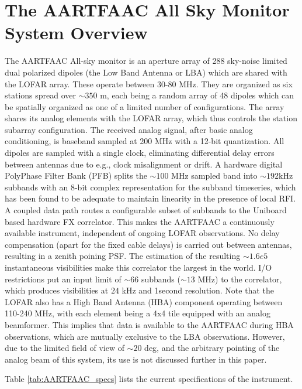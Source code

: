 \documentclass{aa}
\begin{document}
\section{\label{sec:The-AARTFAAC-All}The AARTFAAC All Sky Monitor System
Overview}
The AARTFAAC All-sky monitor is an aperture array of 288 sky-noise
limited dual polarized dipoles (the Low Band Antenna or LBA) which
are shared with the LOFAR array. These operate between 30-80 MHz.
They are organized as six stations spread over $\sim$$350$ m, each
being a random array of 48 dipoles which can be spatially organized
as one of a limited number of configurations. The array shares its
analog elements with the LOFAR array, which thus controls the station
subarray configuration. The received analog signal, after basic analog
conditioning, is baseband sampled at 200 MHz with a 12-bit quantization.
All dipoles are sampled with a single clock, eliminating differential
delay errors between antennas due to e.g., clock misalignment or drift.
A hardware digital PolyPhase Filter Bank (PFB) splits the $\sim$$100$
MHz sampled band into $\sim$$192$kHz subbands with an 8-bit complex
representation for the subband timeseries, which has been found to
be adequate to maintain linearity in the presence of local RFI. A
coupled data path routes a configurable subset of subbands to the
Uniboard based hardware FX correlator. This makes the AARTFAAC a continuously
available instrument, independent of ongoing LOFAR observations. No
delay compensation (apart for the fixed cable delays) is carried out
between antennas, resulting in a zenith poining PSF. The estimation
of the resulting $\sim$$1.6e5$ instantaneous visibilities make this
correlator the largest in the world. I/O restrictions put an input
limit of $\sim$$66$ subbands ($\sim$$13$ MHz) to the correlator,
which produces visibilities at $24$ kHz and 1second resolution. Note
that the LOFAR also has a High Band Antenna (HBA) component operating
between 110-240 MHz, with each element being a 4x4 tile equipped with
an analog beamformer. This implies that data is available to the AARTFAAC
during HBA observations, which are mutually exclusive to the LBA observations.
However, due to the limited field of view of $\sim$$20$ deg, and
the arbitrary pointing of the analog beam of this system, its use
is not discussed further in this paper. 

Table \ref{tab:AARTFAAC_specs} lists the current specifications of
the instrument. 
\end{document}
